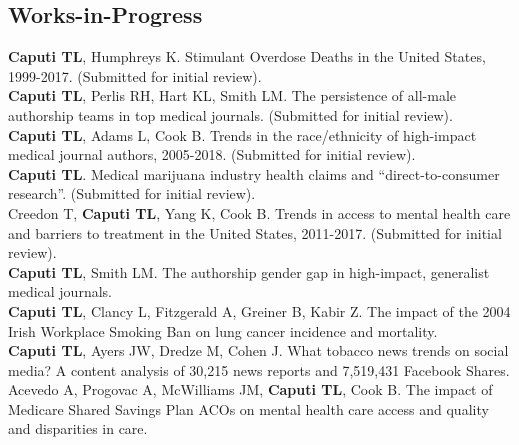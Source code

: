 \documentclass[11pt, letterpaper]{article}
\begin{document}
\subsection*{Works-in-Progress}
\noindent
\textbf{Caputi TL}, Humphreys K. Stimulant Overdose Deaths in the United States, 1999-2017. (Submitted for initial review).\\[.2cm]
\textbf{Caputi TL}, Perlis RH, Hart KL, Smith LM. The persistence of all-male authorship teams in top medical journals. (Submitted for initial review).\\[.2cm]
\textbf{Caputi TL}, Adams L, Cook B. Trends in the race/ethnicity of high-impact medical journal authors, 2005-2018. (Submitted for initial review).\\[.2cm]
\clearpage
\textbf{Caputi TL}. Medical marijuana industry health claims and “direct-to-consumer research”. (Submitted for initial review).\\[.2cm]
Creedon T, \textbf{Caputi TL}, Yang K, Cook B. Trends in access to mental health care and barriers to treatment in the United States, 2011-2017. (Submitted for initial review).\\[.2cm]
\textbf{Caputi TL}, Smith LM. The authorship gender gap in high-impact, generalist medical journals.\\[.2cm]
\textbf{Caputi TL}, Clancy L, Fitzgerald A, Greiner B, Kabir Z. The impact of the 2004 Irish Workplace Smoking Ban on lung cancer incidence and mortality.\\[.2cm]
\textbf{Caputi TL}, Ayers JW, Dredze M, Cohen J. What tobacco news trends on social media? A content analysis of 30,215 news reports and 7,519,431 Facebook Shares.\\[.2cm]
Acevedo A, Progovac A, McWilliams JM, \textbf{Caputi TL}, Cook B. The impact of Medicare Shared Savings Plan ACOs on mental health care access and quality and disparities in care.\\[.2cm]
\end{document}

